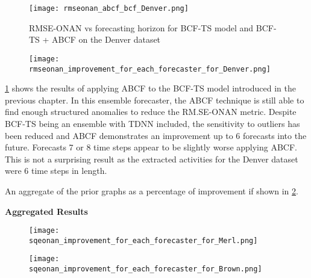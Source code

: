 \begin{figure}[!h]
	\begin{center}
		\texttt{[image: rmseonan\_abcf\_bcf\_Denver.png]}
	\end{center}
	\caption{RMSE-ONAN vs forecasting horizon for BCF-TS model and BCF-TS + ABCF on the Denver dataset}
	\label{fig:bcf_abcf_rmseonan_denver}
\end{figure}

\begin{figure}[!h]
	\begin{center}
		\texttt{[image: rmseonan\_improvement\_for\_each\_forecaster\_for\_Denver.png]}
	\end{center}
	\caption{}
	\label{fig:rmseonan_improve_denver}
\end{figure}

\ref{fig:bcf_abcf_rmseonan_denver} shows the results of applying ABCF to the BCF-TS model introduced in the previous chapter.  In this ensemble forecaster, the ABCF technique is still able to find enough structured anomalies to reduce the RM.SE-ONAN metric.  Despite BCF-TS being an ensemble with TDNN included, the sensitivity to outliers has been reduced and ABCF demonstrates an improvement up to 6 forecasts into the future.  Forecasts 7 or 8 time steps appear to be slightly worse applying ABCF.  This is not a surprising result as the extracted activities for the Denver dataset were 6 time steps in length.

An aggregate of the prior graphs as a percentage of improvement if shown in \ref{fig:rmseonan_improve_denver}.  


\bigskip
\noindent \textbf{Aggregated Results} 

\begin{figure}[!h]
	\begin{center}
		\texttt{[image: sqeonan\_improvement\_for\_each\_forecaster\_for\_Merl.png]}
	\end{center}
	\caption{}
	\label{fig:sqe_improve_merl}
\end{figure}

\begin{figure}[!h]
	\begin{center}
		\texttt{[image: sqeonan\_improvement\_for\_each\_forecaster\_for\_Brown.png]}
	\end{center}
	\caption{}
	\label{fig:sqe_improve_brown}
\end{figure}


